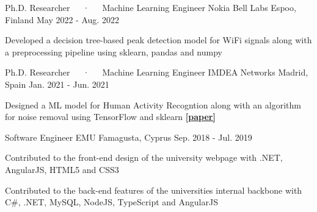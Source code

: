\begin{cventries}
  \cventry
    {Ph.D. Researcher~~~·~~~Machine Learning Engineer} %
    {Nokia Bell Labs} %
    {Espoo, Finland} %
    {May  2022 - Aug. 2022} %
    {
      \begin{cvitems} %
        \item {Developed a decision tree-based peak detection model for WiFi signals along with a preprocessing pipeline using sklearn, pandas and numpy}
      \end{cvitems}
    }

  \cventry
    {Ph.D. Researcher~~~·~~~Machine Learning Engineer} %
    {IMDEA Networks} %
    {Madrid, Spain} %
    {Jan. 2021 - Jun. 2021} %
    {
      \begin{cvitems} %
        \item {Designed a ML model for Human Activity Recogntion along with an algorithm for noise removal using TensorFlow and sklearn \href{https://ieeexplore.ieee.org/abstract/document/10172159/}{\textbf{[paper]}}}
      \end{cvitems}
    }

  \cventry
    {Software Engineer} %
    {EMU} %
    {Famagusta, Cyprus} %
    {Sep. 2018 - Jul. 2019} %
    {
      \begin{cvitems} %
        \item {Contributed to the front-end design of the university webpage with .NET, AngularJS, HTML5 and CSS3}
        \item {Contributed to the back-end features of the universities internal backbone with C\#, .NET, MySQL, NodeJS, TypeScript and AngularJS}
      \end{cvitems}
    }


\end{cventries}
